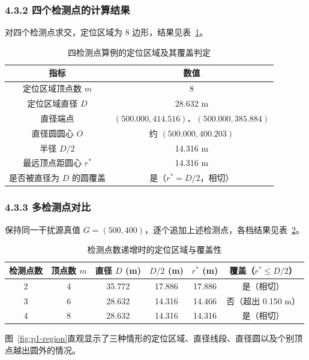 \documentclass[UTF8, zihao=5,AutoFakeBold=2]{ctexart}
\begin{document}
	\subsubsection*{4.3.2 四个检测点的计算结果}

	对四个检测点求交，定位区域为 8 边形，结果见表~\ref{tab:p1-four}。

	\begin{table}[H]
		\centering
		\caption{四检测点算例的定位区域及其覆盖判定}
		\label{tab:p1-four}
		\begin{tabular}{cc}
			\toprule
			指标 & 数值 \\
			\midrule
			定位区域顶点数 \(m\) & 8 \\
			定位区域直径 \(D\) & 28.632 m \\
			直径端点 & \((500.000,414.516)\)、\((500.000,385.884)\) \\
			直径圆圆心 \(O\) & 约 \((500.000,400.203)\) \\
			半径 \(D/2\) & 14.316 m \\
			最远顶点距圆心 \(r^*\) & 14.316 m \\
			是否被直径为 \(D\) 的圆覆盖 & 是（\(r^*=D/2\)，相切） \\
			\bottomrule
		\end{tabular}
	\end{table}

	\subsubsection*{4.3.3 多检测点对比}

	保持同一干扰源真值 \(G=(500,400)\)，逐个追加上述检测点，各档结果见表~\ref{tab:p1-compare}。

	\begin{table}[H]
		\centering
		\caption{检测点数递增时的定位区域与覆盖性}
		\label{tab:p1-compare}
		\begin{tabular}{cccccc}
			\toprule
			检测点数 & 顶点数 \(m\) & 直径 \(D\) (m) & \(D/2\) (m) & \(r^*\) (m) & 覆盖（\(r^*\le D/2\)） \\
			\midrule
			2 & 4 & 35.772 & 17.886 & 17.886 & 是（相切） \\
			3 & 6 & 28.632 & 14.316 & 14.466 & 否（超出 0.150 m） \\
			4 & 8 & 28.632 & 14.316 & 14.316 & 是（相切） \\
			\bottomrule
		\end{tabular}
	\end{table}

	图~\ref{fig:p1-region}直观显示了三种情形的定位区域、直径线段、直径圆以及个别顶点越出圆外的情况。
\end{document}
